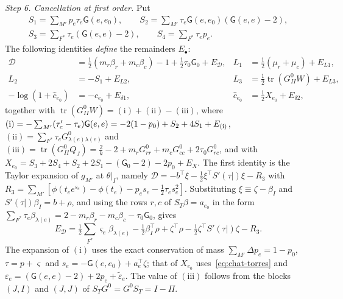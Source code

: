 \emph{Step 6. Cancellation at first order.} Put
\begin{gather*}
 S_1=\sum_{M'}p_e\tau_e\mathsf G(e,e_0),\qquad
 S_2=\sum_{M'}\tau_e\mathsf G(e,e_0)(\mathsf G(e,e)-2),\\
 S_3=\sum_{F^*}\tau_e(\mathsf G(e,e)-2),\qquad S_4=\sum_{F^*}\tau_ep_e .
\end{gather*}
The following identities \emph{define} the remainders $E_\bullet$:
\begin{align*}
 \mathcal D&=\tfrac12(m_r\beta_r+m_c\beta_c)-1+\tfrac12\tau_0\mathsf G_0+E_{\mathcal D}, &
 L_1&=\tfrac12(\mu_r+\mu_c)+E_{L1},\\
 L_2&=-S_1+E_{L2}, &
 L_3&=\tfrac12\operatorname{tr}(G^0_{II}W)+E_{L3},\\
 -\log(1+\hat c_{e_0})&=-\hat c_{e_0}+E_{\delta1}, &
 \hat c_{e_0}&=\tfrac12X_{e_0}+E_{\delta2},
\end{align*}
together with $\operatorname{tr}(G^0_{II}W)=\mathrm{(i)}+\mathrm{(ii)}-\mathrm{(iii)}$, where
$\mathrm{(i)}=-\sum_{M'}(\tau'_e-\tau_e)\mathsf G(e,e)=-2(1-p_0)+S_2+4S_1+E_{\rm(i)}$,
$\mathrm{(ii)}=\sum_{F^*}\tau_eG^0_{\lambda(e)\lambda(e)}$ and
$\mathrm{(iii)}=\operatorname{tr}(G^0_{II}Q_J)=\tfrac2k-2+m_rG^0_{rr}+m_cG^0_{cc}+2\tau_0G^0_{rc}$, and
with $X_{e_0}=S_3+2S_4+S_2+2S_1-(\mathsf G_0-2)-2p_0+E_X$. The first identity is the Taylor expansion of
$g_{M'}$ at $\theta|_I$, namely $\mathcal D=-b^\top\xi-\tfrac12\xi^\top S'(\tau|)\xi-R_3$ with
$R_3=\sum_{M'}[\phi(t_ee^{s_e})-\phi(t_e)-p_es_e-\tfrac12\tau_es_e^2]$. Substituting
$\xi\equiv\zeta-\beta_I$ and $S'(\tau|)\beta_I=b+\rho$, and using the rows $r,c$ of
$S_T\beta=a_{e_0}$ in the form $\sum_{F^*}\tau_e\beta_{\lambda(e)}=2-m_r\beta_r-m_c\beta_c-\tau_0\mathsf
G_0$, gives
\[
 E_{\mathcal D}=\tfrac12\sum_{F^*}\varsigma_e\beta_{\lambda(e)}-\tfrac12\beta_I^\top\rho+\zeta^\top\rho
   -\tfrac12\zeta^\top S'(\tau|)\zeta-R_3 .
\]
The expansion of $\mathrm{(i)}$ uses the exact conservation of mass $\sum_{M'}\Delta p_e=1-p_0$,
$\tau=p+\varsigma$ and $s_e=-\mathsf G(e,e_0)+a_e^\top\zeta$; that of $X_{e_0}$
uses~\eqref{eq:chat-torres} and $\varepsilon_e=(\mathsf G(e,e)-2)+2p_e+\tilde\varepsilon_e$. The value of
$\mathrm{(iii)}$ follows from the blocks $(J,I)$ and $(J,J)$ of $S_TG^0=G^0S_T=I-\Pi$.

